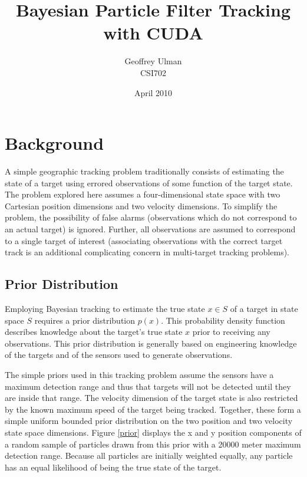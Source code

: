 \documentclass{article}
\begin{document}
\title{Bayesian Particle Filter Tracking with CUDA}
\author{Geoffrey Ulman\\
        CSI702}
\date{April 2010}
\maketitle

\tableofcontents

\section{Background}\label{Background}
A simple geographic tracking problem traditionally consists of estimating the state of a target using errored observations of some function of the target state. The problem explored here assumes a four-dimensional state space with two Cartesian position dimensions and two velocity dimensions. To simplify the problem, the possibility of false alarms (observations which do not correspond to an actual target) is ignored. Further, all observations are assumed to correspond to a single target of interest (associating observations with the correct target track is an additional complicating concern in multi-target tracking problems).

\subsection{Prior Distribution}
Employing Bayesian tracking to estimate the true state \(x \in S\) of a target in state space \(S\) requires a prior distribution \(p(x)\). This probability density function describes knowledge about the target's true state \(x\) prior to receiving any observations. This prior distribution is generally based on engineering knowledge of the targets and of the sensors used to generate observations.

The simple priors used in this tracking problem assume the sensors have a maximum detection range and thus that targets will not be detected until they are inside that range. The velocity dimension of the target state is also restricted by the known maximum speed of the target being tracked. Together, these form a simple uniform bounded prior distribution on the two position and two velocity state space dimensions. Figure \ref{prior} displays the x and y position components of a random sample of particles drawn from this prior with a 20000 meter maximum detection range. Because all particles are initially weighted equally, any particle has an equal likelihood of being the true state of the target.
\end{document}
